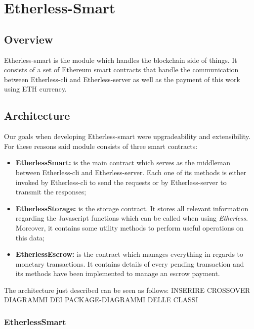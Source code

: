 \section{Etherless-Smart}
	
\subsection{Overview}
	Etherless-smart is the module which handles the blockchain side of things. It consists of a set of Ethereum smart contracts that handle the communication between Etherless-cli and Etherless-server as well as the payment of this work using ETH currency.
	
\subsection{Architecture} %
		Our goals when developing Etherless-smart were upgradeability and extensibility. For these reasons said module consists of three smart contracts:
		\begin{itemize}
			\item \textbf{EtherlessSmart:} is the main contract which serves as the middleman between Etherless-cli and Etherless-server. Each one of its methods is either invoked by Etherless-cli to send the requests or by Etherless-server to transmit the responses;
			\item \textbf{EtherlessStorage:} is the storage contract. It stores all relevant information regarding the Javascript functions which can be called when using \textit{Etherless}. Moreover, it contains some utility methods to perform useful operations on this data;
			\item \textbf{EtherlessEscrow:} is the contract which manages everything in regards to monetary transactions. It contains details of every pending transaction and its methods have been implemented to manage an escrow payment.
		\end{itemize}
The architecture just described can be seen as follows: INSERIRE CROSSOVER DIAGRAMMI DEI PACKAGE-DIAGRAMMI DELLE CLASSI
		
\subsubsection{EtherlessSmart}
		
